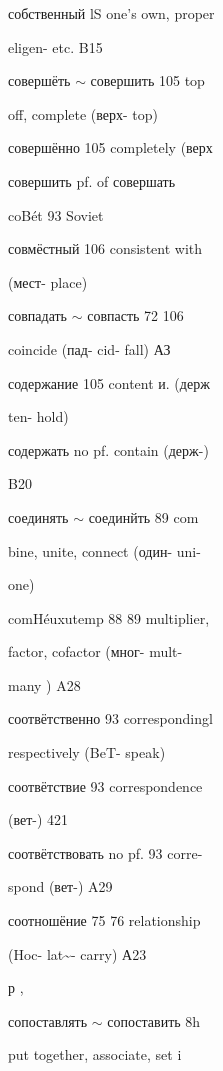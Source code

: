 \begin{minipage}[t]{0.475\textwidth}
\raggedright
\noindent собственный lS one's own, proper\par
\noindent eligen- etc. B15\par
\noindent совершёть $\sim$ совершить 105 top\par
\noindent off, complete (верх- top)\par
\noindent совершённо 105 completely (верх\par
\noindent совершить pf. of совершать\par
\noindent coBét 93 Soviet\par
\noindent совмёстный 106 consistent with\par
\noindent (мест- place)\par
\noindent совпадать $\sim$ совпасть 72 106\par
\noindent coincide (пад- cid- fall) АЗ\par
\noindent содержание 105 content и. (держ\par
\noindent ten- hold)\par
\noindent содержать no pf. contain (держ-)\par
\noindent B20\par
\noindent соединять $\sim$ соединйть 89 com\par
\noindent bine, unite, connect (один- uni-\par
\noindent one)\par
\noindent comHéuxutemp 88 89 multiplier,\par
\noindent factor, cofactor (мног- mult-\par
\noindent many ) A28\par
\noindent соотвётственно 93 correspondingl\par
\noindent respectively (BeT- speak)\par
\noindent соотвётствие 93 correspondence\par
\noindent (вет-) 421\par
\noindent соотвётствовать no pf. 93 corre-\par
\noindent spond (вет-) A29\par
\noindent соотношёние 75 76 relationship\par
\noindent (Hoc- lat\textasciitilde{}- carry) А23\par
{} р ,\par
{} сопоставлять $\sim$ сопоставить 8h\par
{} put together, associate, set i\par

\end{minipage}
